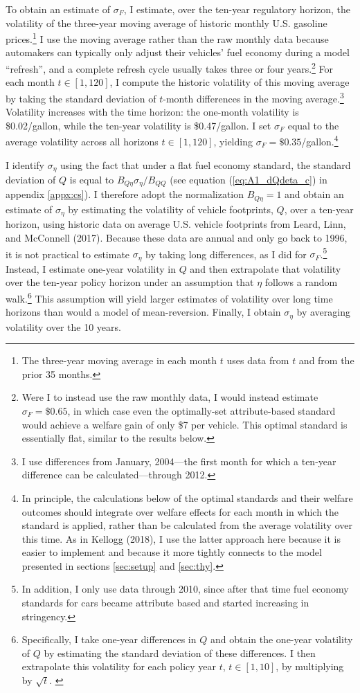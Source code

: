 \documentclass[12pt]{article}
\begin{document}
To obtain an estimate of $\sigma_F$, I estimate, over the ten-year regulatory horizon, the volatility of the three-year moving average of historic monthly U.S. gasoline prices.\footnote{The three-year moving average in each month $t$ uses data from $t$ and from the prior 35 months.} I use the moving average rather than the raw monthly data because automakers can typically only adjust their vehicles' fuel economy during a model ``refresh'', and a complete refresh cycle usually takes three or four years.\footnote{Were I to instead use the raw monthly data, I would instead estimate $\sigma_F=\$0.65$, in which case even the optimally-set attribute-based standard would achieve a welfare gain of only \$7 per vehicle. This optimal standard is essentially flat, similar to the results below.} For each month $t\in[1,120]$, I compute the historic volatility of this moving average by taking the standard deviation of $t$-month differences in the moving average.\footnote{I use differences from January, 2004---the first month for which a ten-year difference can be calculated---through 2012.} Volatility increases with the time horizon: the one-month volatility is \$0.02/gallon, while the ten-year volatility is \$0.47/gallon. I set $\sigma_F$ equal to the average volatility across all horizons $t\in[1,120]$, yielding $\sigma_F=\$0.35$/gallon.\footnote{In principle, the calculations below of the optimal standards and their welfare outcomes should integrate over welfare effects for each month in which the standard is applied, rather than be calculated from the average volatility over this time. As in Kellogg (2018), I use the latter approach here because it is easier to implement and because it more tightly connects to the model presented in sections \ref{sec:setup} and \ref{sec:thy}.}

I identify $\sigma_{\eta}$ using the fact that under a flat fuel economy standard, the standard deviation of $Q$ is equal to $B_{Q\eta}\sigma_{\eta}/B_{QQ}$ (see equation (\ref{eq:A1_dQdeta_c}) in appendix \ref{appx:cs}). I therefore adopt the normalization $B_{Q\eta}=1$ and obtain an estimate of $\sigma_{\eta}$ by estimating the volatility of vehicle footprints, $Q$, over a ten-year horizon, using historic data on average U.S. vehicle footprints from Leard, Linn, and McConnell (2017). Because these data are annual and only go back to 1996, it is not practical to estimate $\sigma_{\eta}$ by taking long differences, as I did for $\sigma_F$.\footnote{In addition, I only use data through 2010, since after that time fuel economy standards for cars became attribute based and started increasing in stringency.} Instead, I estimate one-year volatility in $Q$ and then extrapolate that volatility over the ten-year policy horizon under an assumption that $\eta$ follows a random walk.\footnote{Specifically, I take one-year differences in $Q$ and obtain the one-year volatility of $Q$ by estimating the standard deviation of these differences. I then extrapolate this volatility for each policy year $t$, $t\in[1,10]$, by multiplying by $\sqrt{t}$. \label{fn:vols}} This assumption will yield larger estimates of volatility over long time horizons than would a model of mean-reversion. Finally, I obtain $\sigma_{\eta}$ by averaging volatility over the 10 years.
\end{document}
